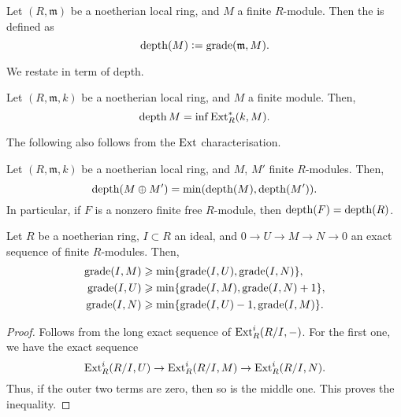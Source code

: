 \documentclass[12pt]{article}
\begin{document}
\begin{defn}
	Let $(R, \mathfrak{m})$ be a noetherian local ring, and $M$ a finite $R$-module. Then the  is defined as
	\begin{equation*} 
		\operatorname{depth}(M) \vcentcolon= \operatorname{grade}(\mathfrak{m}, M).
	\end{equation*}
\end{defn}
We restate  in term of depth.

\begin{thm}
	Let $(R, \mathfrak{m}, k)$ be a noetherian local ring, and $M$ a finite module. Then,
	\begin{equation*} 
		\operatorname{depth} M = \inf \operatorname{Ext}_{R}^{\ast}(k, M).
	\end{equation*}
\end{thm}

The following also follows from the $\operatorname{Ext}$ characterisation.

\begin{cor} \label{cor:depth-direct-sum}
	Let $(R, \mathfrak{m}, k)$ be a noetherian local ring, and $M$, $M'$ finite $R$-modules. Then,
	\begin{equation*} 
		\operatorname{depth}(M \oplus M') = \min(\operatorname{depth}(M), \operatorname{depth}(M')).
	\end{equation*}
	In particular, if $F$ is a nonzero finite free $R$-module, then $\operatorname{depth}(F) = \operatorname{depth}(R)$.
\end{cor}

\begin{prop} \label{prop:grade-exact-sequence}
	Let $R$ be a noetherian ring, $I \subset R$ an ideal, and $0 \to U \to M \to N \to 0$ an exact sequence of finite $R$-modules. Then,
	\begin{align*} 
		\operatorname{grade}(I, M) &\geqslant \min\{\operatorname{grade}(I, U), \operatorname{grade}(I, N)\}, \\
		\operatorname{grade}(I, U) &\geqslant \min\{\operatorname{grade}(I, M), \operatorname{grade}(I, N) + 1\}, \\
		\operatorname{grade}(I, N) &\geqslant \min\{\operatorname{grade}(I, U) - 1, \operatorname{grade}(I, M)\}.
	\end{align*}
\end{prop}
\begin{proof}
	Follows from the long exact sequence of $\operatorname{Ext}_{R}^{i}(R/I, -)$. For the first one, we have the exact sequence
	\begin{equation*} 
		\operatorname{Ext}_{R}^{i}(R/I, U) \to \operatorname{Ext}_{R}^{i}(R/I, M) \to \operatorname{Ext}_{R}^{i}(R/I, N).
	\end{equation*}
	Thus, if the outer two terms are zero, then so is the middle one. This proves the inequality.
\end{proof}
\end{document}
